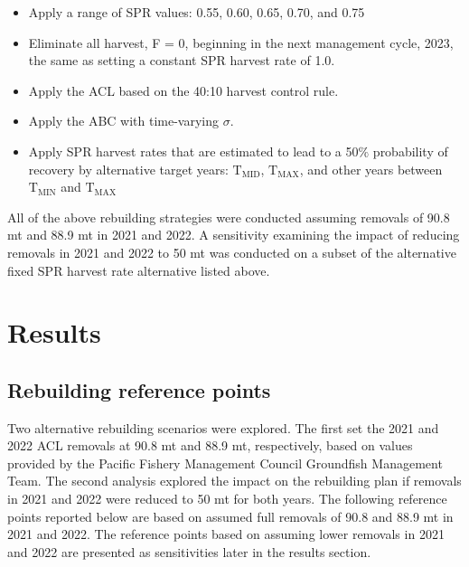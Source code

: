 \documentclass[11pt,
  english,
  a4paper,
]{article}
\begin{document}
\leavevmode\tagmcend\tagstructend\par

\begin{itemize}
    \item Apply a range of SPR values: 0.55, 0.60, 0.65, 0.70, and 0.75 
    \item Eliminate all harvest, F = 0, beginning in the next management cycle, 2023, the same as setting a constant SPR harvest rate of 1.0.
    \item Apply the ACL based on the 40:10 harvest control rule.
    \item Apply the ABC with time-varying $\sigma$.
    \item Apply SPR harvest rates that are estimated to lead to a 50$\%$ probability of recovery by alternative target years: $\text{T}_\text{MID}$, $\text{T}_\text{MAX}$, and other years between $\text{T}_\text{MIN}$ and $\text{T}_\text{MAX}$
\end{itemize}


All of the above rebuilding strategies were conducted assuming removals of 90.8 mt and 88.9 mt in 2021 and 2022. A sensitivity examining the impact of reducing removals in 2021 and 2022 to 50 mt was conducted on a subset of the alternative fixed SPR harvest rate alternative listed above.

\leavevmode\tagmcend\tagstructend\par


\hypertarget{results}{%
\section{Results}\label{results}}

\leavevmode\tagmcend\tagstructend


\hypertarget{rebuilding-reference-points}{%
\subsection{Rebuilding reference points}\label{rebuilding-reference-points}}

\leavevmode\tagmcend\tagstructend


Two alternative rebuilding scenarios were explored. The first set the 2021 and 2022 ACL removals at 90.8 mt and 88.9 mt, respectively, based on values provided by the Pacific Fishery Management Council Groundfish Management Team. The second analysis explored the impact on the rebuilding plan if removals in 2021 and 2022 were reduced to 50 mt for both years. The following reference points reported below are based on assumed full removals of 90.8 and 88.9 mt in 2021 and 2022. The reference points based on assuming lower removals in 2021 and 2022 are presented as sensitivities later in the results section.
\end{document}
